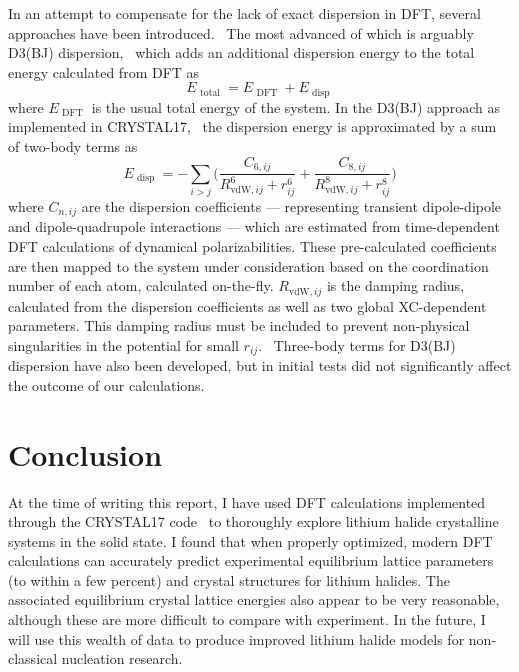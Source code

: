 \documentclass[titlepage,11pt]{article}
\begin{document}
	
	
	
	
	
In an attempt to compensate for the lack of exact dispersion in DFT, several approaches have been introduced.~\cite{grimme2016dispersion} The most advanced of which is arguably D3(BJ) dispersion,~\cite{Grimme2010,grimme2016dispersion,Becke2007,Grimme2011} which adds an additional dispersion energy to the total energy calculated from DFT as
\begin{equation}
E_{\text { total }} = E_{\text { DFT } } + E_{\text { disp } }
\end{equation}
where $E_{\text { DFT } }$ is the usual total energy of the system. In the D3(BJ) approach as implemented in CRYSTAL17,~\cite{Crystal17Manual} the dispersion energy is approximated by a sum of two-body terms as
\begin{equation}
E _ { \text { disp } } = - \sum _ { i > j } \bigg( \frac { C _ { 6 , i j } } { R _ { \text {vdW}, i j } ^ { 6 } + r _ { i j } ^ { 6 } } + \frac { C _ { 8 , i j } } { R _ { \text {vdW}, i j } ^ { 8 } + r _ { i j } ^ { 8 } }  \bigg)
\label{eq:Dispersion}
\end{equation}
where $C _ { n , i j }$ are the dispersion coefficients --- representing transient dipole-dipole and dipole-quadrupole interactions --- which are estimated from time-dependent DFT calculations of dynamical polarizabilities. These pre-calculated coefficients are then mapped to the system under consideration based on the coordination number of each atom, calculated on-the-fly. $R _ { \text {vdW}, i j }$ is the damping radius, calculated from the dispersion coefficients as well as two global XC-dependent parameters. This damping radius must be included to prevent non-physical singularities in the potential for small $r_{ij}$.~\cite{grimme2016dispersion} Three-body terms for D3(BJ) dispersion have also been developed, but in initial tests did not significantly affect the outcome of our calculations.
	
	
\section{Conclusion}

At the time of writing this report, I have used DFT calculations implemented through the CRYSTAL17 code~\cite{Crystal17} to thoroughly explore lithium halide crystalline systems in the solid state. I found that when properly optimized, modern DFT calculations can accurately predict experimental equilibrium lattice parameters (to within a few percent) and crystal structures for lithium halides. The associated equilibrium crystal lattice energies also appear to be very reasonable, although these are more difficult to compare with experiment. In the future, I will use this wealth of data to produce improved lithium halide models for non-classical nucleation research.

\singlespacing


	
\end{document}
